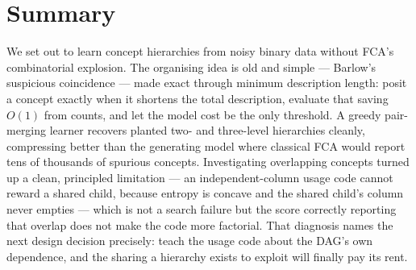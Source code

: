 \documentclass[11pt]{article}
\begin{document}
\section*{Summary}

We set out to learn concept hierarchies from noisy binary data without FCA's
combinatorial explosion. The organising idea is old and simple --- Barlow's
suspicious coincidence --- made exact through minimum description length: posit a
concept exactly when it shortens the total description, evaluate that saving
$O(1)$ from counts, and let the model cost be the only threshold. A greedy
pair-merging learner recovers planted two- and three-level hierarchies cleanly,
compressing better than the generating model where classical FCA would report
tens of thousands of spurious concepts. Investigating overlapping concepts
turned up a clean, principled limitation --- an independent-column usage code
cannot reward a shared child, because entropy is concave and the shared child's
column never empties --- which is not a search failure but the score correctly
reporting that overlap does not make the code more factorial. That diagnosis
names the next design decision precisely: teach the usage code about the DAG's
own dependence, and the sharing a hierarchy exists to exploit will finally pay
its rent.



\end{document}
